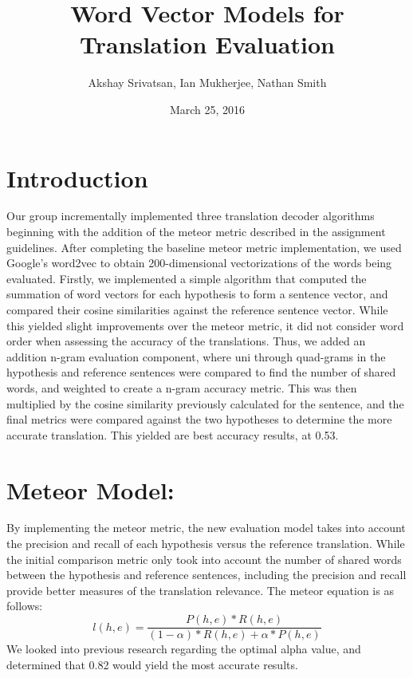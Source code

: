 \documentclass[11pt]{article}
\begin{document}
\title{Word Vector Models for Translation Evaluation}
\author{Akshay Srivatsan, Ian Mukherjee, Nathan Smith}
\date{March 25, 2016}
\maketitle

\section{\textbf{Introduction}}
	Our group incrementally implemented three translation decoder algorithms beginning with the addition of the meteor metric described in the assignment guidelines. After completing the baseline meteor metric implementation, we used Google's word2vec to obtain 200-dimensional vectorizations of the words being evaluated. Firstly, we implemented a simple algorithm that computed the summation of word vectors for each hypothesis to form a sentence vector, and compared their cosine similarities against the reference sentence vector. While this yielded slight improvements over the meteor metric, it did not consider word order when assessing the accuracy of the translations. Thus, we added an addition n-gram evaluation component, where uni through quad-grams in the hypothesis and reference sentences were compared to find the number of shared words, and weighted to create a n-gram accuracy metric. This was then multiplied by the cosine similarity previously calculated for the sentence, and the final metrics were compared against the two hypotheses to determine the more accurate translation. This yielded are best accuracy results, at 0.53.

\section{\textbf{Meteor Model:}}

	By implementing the meteor metric, the new evaluation model takes into account the precision and recall of each hypothesis versus the reference translation. While the initial comparison metric only took into account the number of shared words between the hypothesis and reference sentences, including the precision and recall provide better measures of the translation relevance. The meteor equation is as follows:
$$l(h, e) = \frac{P(h, e) * R(h, e)}{(1 - \alpha) * R(h, e) + \alpha * P(h, e)}$$
We looked into previous research regarding the optimal alpha value, and determined that 0.82 would yield the most accurate results. 
	
\end{document}

